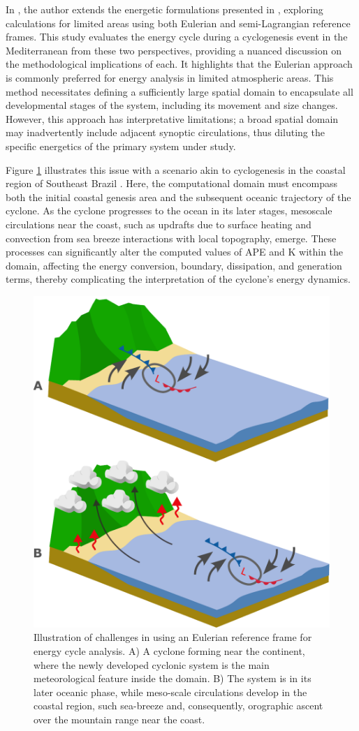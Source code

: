In \citet{michaelides1999quasi}, the author extends the energetic formulations presented in \citet{michaelides1987limited}, exploring calculations for limited areas using both Eulerian and semi-Lagrangian reference frames. This study evaluates the energy cycle during a cyclogenesis event in the Mediterranean from these two perspectives, providing a nuanced discussion on the methodological implications of each. It highlights that the Eulerian approach is commonly preferred for energy analysis in limited atmospheric areas. This method necessitates defining a sufficiently large spatial domain to encapsulate all developmental stages of the system, including its movement and size changes. However, this approach has interpretative limitations; a broad spatial domain may inadvertently include adjacent synoptic circulations, thus diluting the specific energetics of the primary system under study.

Figure \ref{fixed_framework_issues} illustrates this issue with a scenario akin to cyclogenesis in the coastal region of Southeast Brazil \citep[e.g.,]{reboita2010south, gramcianinov2019properties}. Here, the computational domain must encompass both the initial coastal genesis area and the subsequent oceanic trajectory of the cyclone. As the cyclone progresses to the ocean in its later stages, mesoscale circulations near the coast, such as updrafts due to surface heating and convection from sea breeze interactions with local topography, emerge. These processes can significantly alter the computed values of APE and K within the domain, affecting the energy conversion, boundary, dissipation, and generation terms, thereby complicating the interpretation of the cyclone's energy dynamics.

\begin{figure}[h]
\begin{center}
\setcaptionmargin{1cm}
\includegraphics[width=0.5 \columnwidth,angle=0]{fig/limited_area_energetics_example.pdf}
\caption[Eulerian LEC - Issues]{Illustration of challenges in using an Eulerian reference frame for energy cycle analysis. A) A cyclone forming near the continent, where the newly developed cyclonic system is the main meteorological feature inside the domain. B) The system is in its later oceanic phase, while meso-scale circulations develop in the coastal region, such sea-breeze and, consequently, orographic ascent over the mountain range near the coast.}
\label{fixed_framework_issues}
\end{center}
\end{figure}


